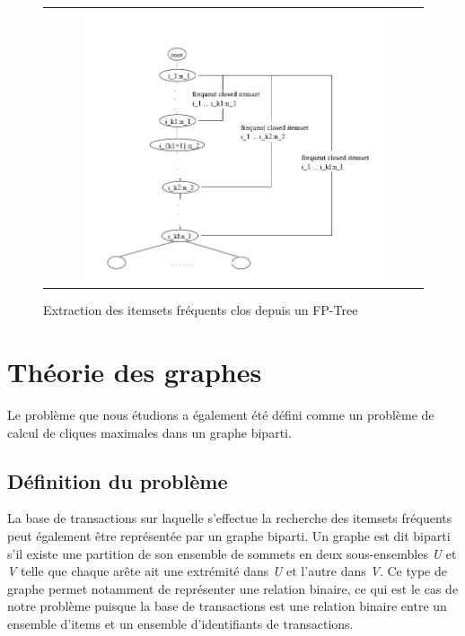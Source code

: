 \documentclass[a4paper,10pt]{report}
\begin{document}
\begin{figure}
	\begin{adjustwidth}{-1cm}{}
	\begin{tabular}{l}
	\includegraphics[width=15cm,height=8cm]{./img/closet_p2}\\
	\end{tabular}
	\caption{\label{fig:text}Extraction des itemsets fréquents clos depuis un FP-Tree}
	\end{adjustwidth}
\end{figure}	

\newpage
\section{Théorie des graphes}
	Le problème que nous étudions a également été défini comme un problème de calcul de cliques maximales dans un graphe biparti. \\
	
\subsection{Définition du problème}
	La base de transactions sur laquelle s'effectue la recherche des itemsets fréquents peut également être représentée par un graphe biparti. Un graphe est dit biparti s'il existe une partition de son ensemble de sommets en deux sous-ensembles \emph{U} et \emph{V} telle que chaque arête ait une extrémité dans \emph{U} et l'autre dans \emph{V}. Ce type de graphe permet notamment de représenter une relation binaire, ce qui est le cas de notre problème puisque la base de transactions est une relation binaire entre un ensemble d'items et un ensemble d'identifiants de transactions. \\
	
\end{document}

